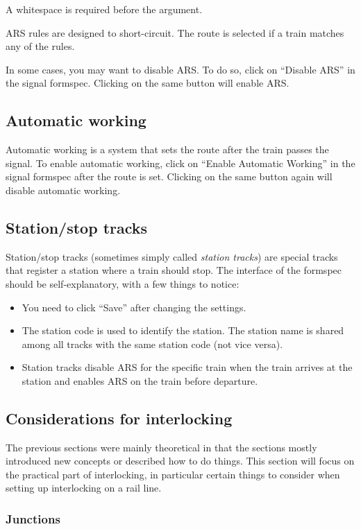 \documentclass[notitlepage]{article}
\begin{document}
A whitespace is required before the argument.

ARS rules are designed to short-circuit. The route is selected if a train matches any of the rules.

In some cases, you may want to disable ARS. To do so, click on ``Disable ARS'' in the signal formspec. Clicking on the same button will enable ARS.

\subsection{Automatic working}\label{s:ilaw}
Automatic working is a system that sets the route after the train passes the signal. To enable automatic working, click on ``Enable Automatic Working'' in the signal formspec after the route is set. Clicking on the same button again will disable automatic working.

\subsection{Station/stop tracks}\label{s:stoprail}
Station/stop tracks (sometimes simply called \textit{station tracks}) are special tracks that register a station where a train should stop. The interface of the formspec should be self-explanatory, with a few things to notice:
\begin{itemize}
\item You need to click ``Save'' after changing the settings.
\item The station code is used to identify the station. The station name is shared among all tracks with the same station code (not vice versa).
\item Station tracks disable ARS for the specific train when the train arrives at the station and enables ARS on the train before departure.
\end{itemize}

\subsection{Considerations for interlocking}\label{s:ilconsiderations}

The previous sections were mainly theoretical in that the sections mostly introduced new concepts or described how to do things. This section will focus on the practical part of interlocking, in particular certain things to consider when setting up interlocking on a rail line.

\subsubsection{Junctions}\label{s:iljunctions}
\end{document}
